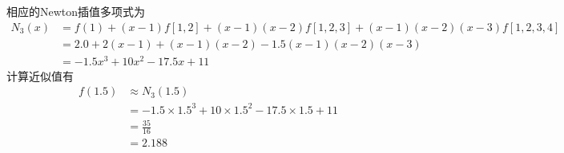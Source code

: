 \documentclass[11pt]{article}
\begin{document}
\begin{question}
{\begin{center}
\begin{tabular}{|c|c|c|c|c|c|}
			\end{tabular}
		\end{center}
		相应的Newton插值多项式为
		\begin{align*}
			N_3(x) &= f(1) + (x - 1)f[1, 2] + (x - 1)(x - 2)f[1, 2, 3] + (x - 1)(x - 2)(x - 3)f[1, 2, 3, 4] \\
			&= 2.0 + 2(x - 1) + (x - 1)(x - 2) - 1.5(x - 1)(x - 2)(x -3) \\
			&= -1.5x^3 + 10x^2 -17.5x + 11
		\end{align*}
		计算近似值有
		\begin{align*}
			f(1.5) &\approx N_3(1.5) \\
			&= -1.5 \times 1.5^3 + 10 \times 1.5^2 - 17.5 \times 1.5 + 11 \\
			&= \frac{35}{16} \\
			&= 2.188
		\end{align*}
	}

\end{question}
\end{document}
